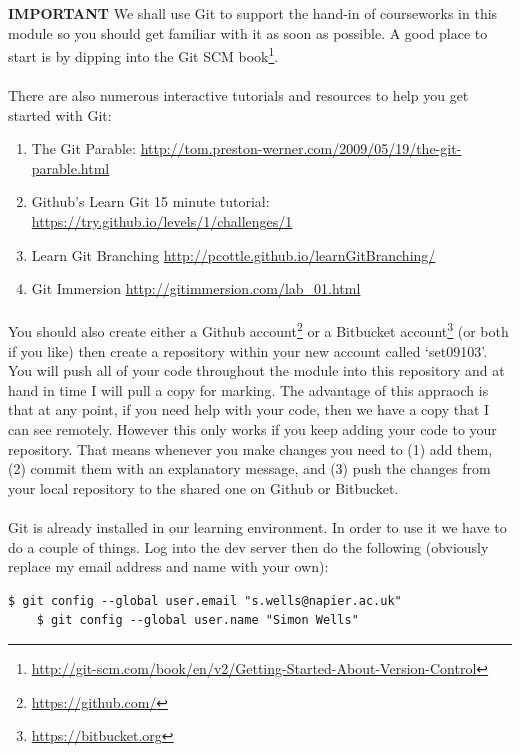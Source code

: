 \documentclass[12pt, a4paper, oneside]{book}
\begin{document}
\textbf{IMPORTANT} We shall use Git to support the hand-in of courseworks in this module so you should get familiar with it as soon as possible. A good place to start is by dipping into the Git SCM book\footnote{\url{http://git-scm.com/book/en/v2/Getting-Started-About-Version-Control}}.

\paragraph{} There are also numerous interactive tutorials and resources to help you get started with Git:
\begin{enumerate}
\item The Git Parable: \url{http://tom.preston-werner.com/2009/05/19/the-git-parable.html}
\item Github's Learn Git 15 minute tutorial: \url{https://try.github.io/levels/1/challenges/1}
\item Learn Git Branching \url{http://pcottle.github.io/learnGitBranching/}
\item Git Immersion \url{http://gitimmersion.com/lab_01.html}
\end{enumerate}

\paragraph{} You should also create either a Github account\footnote{\url{https://github.com/}} or a Bitbucket account\footnote{\url{https://bitbucket.org}} (or both if you like) then create a repository within your new account called `set09103'. You will push all of your code throughout the module into this repository and at hand in time I will pull a copy for marking. The advantage of this appraoch is that at any point, if you need help with your code, then we have a copy that I can see remotely. However this only works if you keep adding your code to your repository. That means whenever you make changes you need to (1) add them, (2) commit them with an explanatory message,  and (3) push the changes from your local repository to the shared one on Github or Bitbucket.


\paragraph{} Git is already installed in our learning environment. In order to use it we have to do a couple of things. Log into the dev server then do the following (obviously replace my email address and name with your own):
\begin{lstlisting}[style=DOS]
    $ git config --global user.email "s.wells@napier.ac.uk"
    $ git config --global user.name "Simon Wells"
\end{lstlisting}
\end{document}

